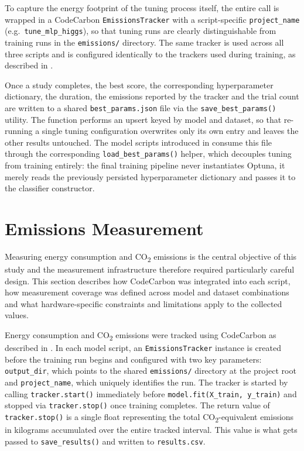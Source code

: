 To capture the energy footprint of the tuning process itself, the entire  call is wrapped in a CodeCarbon \texttt{EmissionsTracker} with a script-specific \texttt{project\_name} (e.g.\ \texttt{tune\_mlp\_higgs}), so that tuning runs are clearly distinguishable from training runs in the \texttt{emissions/} directory. The same tracker is used across all three scripts and is configured identically to the trackers used during training, as described in .

Once a study completes, the best score, the corresponding hyperparameter dictionary, the duration, the emissions reported by the tracker and the trial count are written to a shared \texttt{best\_params.json} file via the \texttt{save\_best\_params()} utility. The function performs an upsert keyed by model and dataset, so that re-running a single tuning configuration overwrites only its own entry and leaves the other results untouched. The model scripts introduced in  consume this file through the corresponding \texttt{load\_best\_params()} helper, which decouples tuning from training entirely: the final training pipeline never instantiates Optuna, it merely reads the previously persisted hyperparameter dictionary and passes it to the classifier constructor.





\section{Emissions Measurement}
\label{implementation_emissions}

Measuring energy consumption and CO\textsubscript{2} emissions is the central objective of this study and the measurement infrastructure therefore required particularly careful design. This section describes how CodeCarbon was integrated into each script, how measurement coverage was defined across model and dataset combinations and what hardware-specific constraints and limitations apply to the collected values.

Energy consumption and CO\textsubscript{2} emissions were tracked using CodeCarbon as described in . In each model script, an \texttt{EmissionsTracker} instance is created before the training run begins and configured with two key parameters: \texttt{output\_dir}, which points to the shared \texttt{emissions/} directory at the project root and \texttt{project\_name}, which uniquely identifies the run. The tracker is started by calling \texttt{tracker.start()} immediately before \texttt{model.fit(X\_train, y\_train)} and stopped via \texttt{tracker.stop()} once training completes. The return value of \texttt{tracker.stop()} is a single float representing the total CO\textsubscript{2}-equivalent emissions in kilograms accumulated over the entire tracked interval. This value is what gets passed to \texttt{save\_results()} and written to \texttt{results.csv}.

